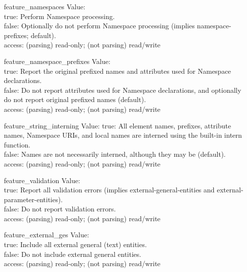 \begin{datadesc}{feature_namespaces}
  Value: \\
  true: Perform Namespace processing.\\
  false: Optionally do not perform Namespace processing
         (implies namespace-prefixes; default).\\
  access: (parsing) read-only; (not parsing) read/write
\end{datadesc}

\begin{datadesc}{feature_namespace_prefixes}
  Value: \\
  true: Report the original prefixed names and attributes used for Namespace
        declarations.\\
  false: Do not report attributes used for Namespace declarations, and
         optionally do not report original prefixed names (default).\\
  access: (parsing) read-only; (not parsing) read/write  
\end{datadesc}

\begin{datadesc}{feature_string_interning}
  Value: 
  true: All element names, prefixes, attribute names, Namespace URIs, and
        local names are interned using the built-in intern function.\\
  false: Names are not necessarily interned, although they may be (default).\\
  access: (parsing) read-only; (not parsing) read/write
\end{datadesc}

\begin{datadesc}{feature_validation}
  Value: \\
  true: Report all validation errors (implies external-general-entities and
        external-parameter-entities).\\
  false: Do not report validation errors.\\
  access: (parsing) read-only; (not parsing) read/write
\end{datadesc}

\begin{datadesc}{feature_external_ges}
  Value: \\
  true: Include all external general (text) entities.\\
  false: Do not include external general entities.\\
  access: (parsing) read-only; (not parsing) read/write
\end{datadesc}

